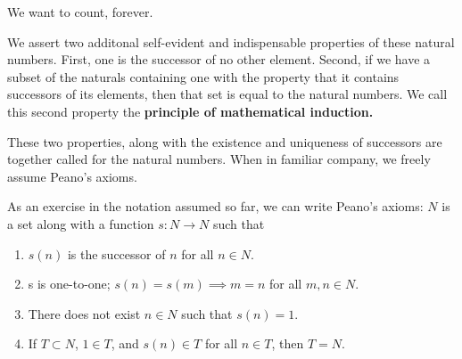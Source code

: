 \sbasic



\sstart



We want to count, forever.


We assert two additonal self-evident and indispensable properties of these natural numbers.
First, one is the successor of no other element.
Second, if we have a subset of the naturals containing one with the property that it contains successors of its elements, then that set is equal to the natural numbers.
We call this second property the \textbf{principle of mathematical induction.}

These two properties, along with the existence
and uniqueness of successors are together called
 for the natural numbers.
When in familiar company, we freely assume Peano's axioms.


As an exercise in the notation assumed so far, we can write Peano's axioms: $N$ is a set along with a function $s: N \to N$ such that
\begin{enumerate}
  \item $s(n)$ is the successor of $n$ for all $n \in N$.
  \item s is one-to-one; $s(n) = s(m) \implies m = n$  for all $m, n \in N$.
  \item There does not exist $n \in N$ such that $s(n) = 1$.
  \item If $T \subset N$, $1 \in T$, and $s(n) \in T$ for all $n \in T$, then $T = N$.
\end{enumerate}

\strats
